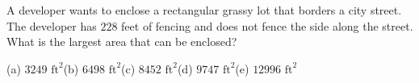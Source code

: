 A developer wants to enclose a rectangular grassy lot that borders a city street. The developer has $228$ feet of fencing and does not fence the side along the street. What is the largest area that can be enclosed?

(a) $3249\text{ ft}^2$\quad (b) $6498\text{ ft}^2$\quad (c) $8452\text{ ft}^2$\quad (d) $9747\text{ ft}^2$\quad (e) $12996\text{ ft}^2$
